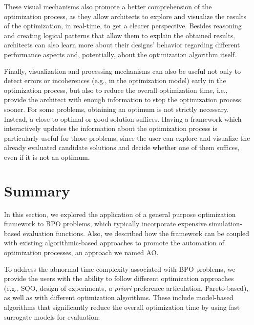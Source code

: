 These visual mechanisms also promote a better comprehension of the optimization process, as they allow architects to explore and visualize the results of the optimization, in real-time, to get a clearer perspective. Besides reasoning and creating logical patterns that allow them to explain the obtained results, architects can also learn more about their designs' behavior regarding different performance aspects and, potentially, about the optimization algorithm itself.

Finally, visualization and processing mechanisms can also be useful not only to detect errors or incoherences (e.g., in the optimization model) early in the optimization process, but also to reduce the overall optimization time, i.e.,  provide the architect with enough information to stop the optimization process sooner. For some problems, obtaining an optimum is not strictly necessary. Instead, a close to optimal or good solution suffices. Having a framework which interactively updates the information about the optimization process is particularly useful for those problems, since the user can explore and visualize the already evaluated candidate solutions and decide whether one of them suffices, even if it is not an optimum. 

\section{Summary}

In this section, we explored the application of a general purpose optimization framework to \ac{BPO} problems, which typically incorporate expensive simulation-based evaluation functions. Also, we described how the framework can be coupled with existing algorithmic-based approaches to promote the automation of optimization processes, an approach we named \ac{AO}.

To address the abnormal time-complexity associated with \ac{BPO} problems, we provide the users with the ability to follow different optimization approaches (e.g., \ac{SOO}, design of experiments, \textit{a priori} preference articulation, Pareto-based), as well as with different optimization algorithms. These include model-based algorithms that significantly reduce the overall optimization time by using fast surrogate models for evaluation. %

